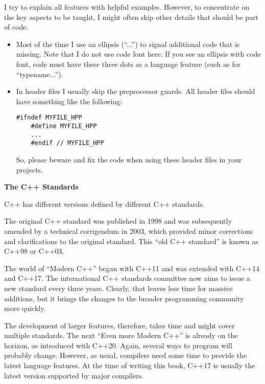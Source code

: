 I try to explain all features with helpful examples. However, to concentrate on the key aspects to be taught, I might often skip other details that should be part of code.\par

\begin{itemize}
	\item Most of the time I use an ellipsis (“...”) to signal additional code that is missing. Note that I do not use code font here. If you see an ellipsis with code font, code must have these three dots as a language feature (such as for “typename...”).
	\item In header files I usually skip the preprocessor guards. All header files should have something like the following:
	\begin{lstlisting}[caption={}]
	#ifndef MYFILE_HPP
	#define MYFILE_HPP
	...
	#endif // MYFILE_HPP
	\end{lstlisting}
	So, please beware and fix the code when using these header files in your projects.
\end{itemize}

\hspace*{\fill} \par %
\textbf{The C++ Standards}

C++ has different versions defined by different C++ standards.\par

The original C++ standard was published in 1998 and was subsequently amended by a technical corrigendum in 2003, which provided minor corrections and clarifications to the original standard. This “old C++ standard” is known as C++98 or C++03.\par

The world of “Modern C++” began with C++11 and was extended with C++14 and C++17. The international C++ standards committee now aims to issue a new standard every three years. Clearly, that leaves less time for massive additions, but it brings the changes to the broader programming community more quickly.\par

The development of larger features, therefore, takes time and might cover multiple standards. The next “Even more Modern C++” is already on the horizon, as introduced with C++20. Again, several ways to program will probably change. However, as usual, compilers need some time to provide the latest language features. At the time of writing this book, C++17 is usually the latest version supported by major compilers.\par

